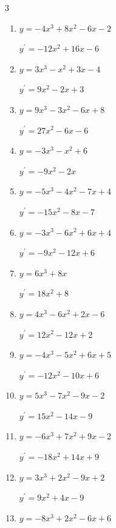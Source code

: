 \begin{multicols}{3}
\begin{enumerate}
        $\displaystyle y^{\prime}=-18x^{2}+16x-4$

  \item $y=-4x^{3}+8x^{2}-6x-2$

        $\displaystyle y^{\prime}=-12x^{2}+16x-6$

  \item $y=3x^{3}-x^{2}+3x-4$

        $\displaystyle y^{\prime}=9x^{2}-2x+3$

  \item $y=9x^{3}-3x^{2}-6x+8$

        $\displaystyle y^{\prime}=27x^{2}-6x-6$

  \item $y=-3x^{3}-x^{2}+6$

        $\displaystyle y^{\prime}=-9x^{2}-2x$

\columnbreak %

  \item $y=-5x^{3}-4x^{2}-7x+4$

        $\displaystyle y^{\prime}=-15x^{2}-8x-7$

  \item $y=-3x^{3}-6x^{2}+6x+4$

        $\displaystyle y^{\prime}=-9x^{2}-12x+6$

  \item $y=6x^{3}+8x$

        $\displaystyle y^{\prime}=18x^{2}+8$

  \item $y=4x^{3}-6x^{2}+2x-6$

        $\displaystyle y^{\prime}=12x^{2}-12x+2$

  \item $y=-4x^{3}-5x^{2}+6x+5$

        $\displaystyle y^{\prime}=-12x^{2}-10x+6$

  \item $y=5x^{3}-7x^{2}-9x-2$

        $\displaystyle y^{\prime}=15x^{2}-14x-9$

  \item $y=-6x^{3}+7x^{2}+9x-2$

        $\displaystyle y^{\prime}=-18x^{2}+14x+9$

  \item $y=3x^{3}+2x^{2}-9x+2$

        $\displaystyle y^{\prime}=9x^{2}+4x-9$

  \item $y=-8x^{3}+2x^{2}-6x+6$


\end{enumerate}
\end{multicols}
